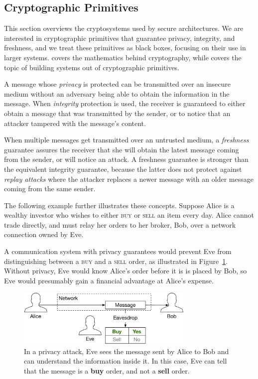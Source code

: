 \subsection{Cryptographic Primitives}

This section overviews the cryptosystems used by secure architectures. We are
interested in cryptographic primitives that guarantee privacy, integrity, and
freshness, and we treat these primitives as black boxes, focusing on their use
in larger systems. \cite{katz2014crypto} covers the mathematics behind
cryptography, while \cite{ferguson2011crypto} covers the topic of building
systems out of cryptographic primitives.

A message whose \textit{privacy} is protected can be transmitted over an
insecure medium without an adversary being able to obtain the information in
the message. When \textit{integrity} protection is used, the receiver is
guaranteed to either obtain a message that was transmitted by the sender, or to
notice that an attacker tampered with the message's content.

When multiple messages get transmitted over an untrusted medium, a
\textit{freshness} guarantee assures the receiver that she will obtain the
latest message coming from the sender, or will notice an attack. A freshness
guarantee is stronger than the equivalent integrity guarantee, because the
latter does not protect against \textit{replay attacks} where the attacker
replaces a newer message with an older message coming from the same sender.

The following example further illustrates these concepts. Suppose Alice is a
wealthy investor who wishes to either \textsc{buy} or \textsc{sell} an item
every day. Alice cannot trade directly, and must relay her orders to her
broker, Bob, over a network connection owned by Eve.

A communication system with privacy guarantees would prevent Eve from
distinguishing between a \textsc{buy} and a \textsc{sell} order, as illustrated
in Figure~\ref{fig:privacy_attack}. Without privacy, Eve would know Alice's
order before it is is placed by Bob, so Eve would presumably gain a financial
advantage at Alice's expense.

\begin{figure}[hbt]
  \centering
  \includegraphics[width=85mm]{figures/privacy_attack.pdf}
  \caption{
    In a privacy attack, Eve sees the message sent by Alice to Bob and can
    understand the information inside it. In this case, Eve can tell that the
    message is a \textbf{buy} order, and not a \textbf{sell} order.
  }
  \label{fig:privacy_attack}
\end{figure}


